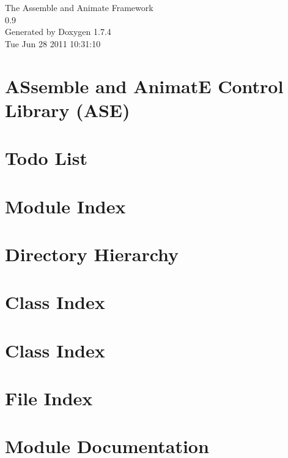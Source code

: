 \documentclass[a4paper]{book}
\begin{document}
\hypersetup{pageanchor=false}
\begin{titlepage}
\vspace*{7cm}
\begin{center}
{\Large The Assemble and Animate Framework \\[1ex]\large 0.9 }\\
\vspace*{1cm}
{\large Generated by Doxygen 1.7.4}\\
\vspace*{0.5cm}
{\small Tue Jun 28 2011 10:31:10}\\
\end{center}
\end{titlepage}
\clearemptydoublepage
{}
\tableofcontents
\clearemptydoublepage
{}
\hypersetup{pageanchor=true}
\chapter{ASsemble and AnimatE Control Library (ASE)}
\label{index}\hypertarget{index}{}
\chapter{Todo List}
\label{todo}
\hypertarget{todo}{}

\chapter{Module Index}

\chapter{Directory Hierarchy}

\chapter{Class Index}

\chapter{Class Index}

\chapter{File Index}

\chapter{Module Documentation}



\end{document}
